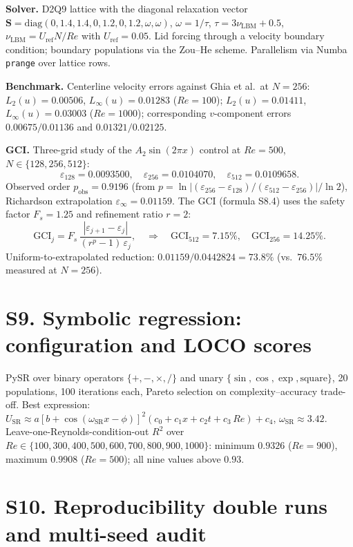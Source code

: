 \documentclass[11pt]{article}
\begin{document}
\textbf{Solver.} D2Q9 lattice with the diagonal relaxation vector
$\mathbf{S}=\mathrm{diag}(0,1.4,1.4,0,1.2,0,1.2,\omega,\omega)$,
$\omega=1/\tau$, $\tau=3\nu_{\mathrm{LBM}}+0.5$,
$\nu_{\mathrm{LBM}}=U_{\mathrm{ref}}N/Re$ with $U_{\mathrm{ref}}=0.05$.
Lid forcing through a velocity boundary condition; boundary populations via
the Zou--He scheme. Parallelism via Numba \texttt{prange} over lattice rows.

\textbf{Benchmark.} Centerline velocity errors against Ghia et al.\ at
$N=256$: $L_2(u)=0.00506$, $L_\infty(u)=0.01283$ ($Re=100$);
$L_2(u)=0.01411$, $L_\infty(u)=0.03003$ ($Re=1000$); corresponding
$v$-component errors $0.00675/0.01136$ and $0.01321/0.02125$.

\textbf{GCI.} Three-grid study of the $A_2\sin(2\pi x)$ control at $Re=500$,
$N\in\{128,256,512\}$:
\[
\varepsilon_{128}=0.0093500,\quad
\varepsilon_{256}=0.0104070,\quad
\varepsilon_{512}=0.0109658 .
\]
Observed order $p_{\mathrm{obs}}=0.9196$ (from
$p=\ln|(\varepsilon_{256}-\varepsilon_{128})/(\varepsilon_{512}-\varepsilon_{256})|/\ln 2$),
Richardson extrapolation
$\varepsilon_{\infty}=0.01159$. The GCI (formula S8.4) uses the safety factor
$F_s=1.25$ and refinement ratio $r=2$:
\[
\mathrm{GCI}_{j}=F_s\,\frac{|\varepsilon_{j+1}-\varepsilon_{j}|}{(r^{p}-1)\,\varepsilon_{j}},
\quad\Rightarrow\quad
\mathrm{GCI}_{512}=7.15\%,\quad \mathrm{GCI}_{256}=14.25\% .
\]
Uniform-to-extrapolated reduction:
$0.01159/0.0442824=73.8\%$ (vs.\ $76.5\%$ measured at $N=256$).

\section{S9. Symbolic regression: configuration and LOCO scores}
\label{sec:S9}

PySR over binary operators $\{+,-,\times,/\}$ and unary
$\{\sin,\cos,\exp,\mathrm{square}\}$, 20 populations, 100 iterations each,
Pareto selection on complexity--accuracy trade-off. Best expression:
$U_{\mathrm{SR}}\approx a[b+\cos(\omega_{\mathrm{SR}}x-\phi)]^2
(c_0+c_1x+c_2t+c_3\,Re)+c_4$, $\omega_{\mathrm{SR}}\approx3.42$.
Leave-one-Reynolds-condition-out $R^2$ over
$Re\in\{100,300,400,500,600,700,800,900,1000\}$: minimum $0.9326$ ($Re=900$),
maximum $0.9908$ ($Re=500$); all nine values above $0.93$.

\section{S10. Reproducibility double runs and multi-seed audit}
\label{sec:S10}
\end{document}
